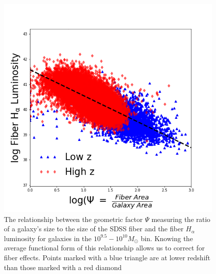 \documentclass[iop]{emulateapj}
\begin{document}
\begin{figure}
	\centering
	\includegraphics[width= \columnwidth]{alpha_regression_9_5.png}
	\caption{The relationship between the geometric factor $\Psi$ measuring the ratio of a galaxy's size to the size of the SDSS fiber and the fiber $H_{\alpha}$ luminosity for galaxies in the $10^{9.5} - 10^{10} M_{\odot}$ bin. Knowing the average functional form of this relationship allows us to correct for fiber effects. Points marked with a blue triangle are at lower redshift than those marked with a red diamond}
     \label{fig:steps}

\end{figure}
\end{document}
